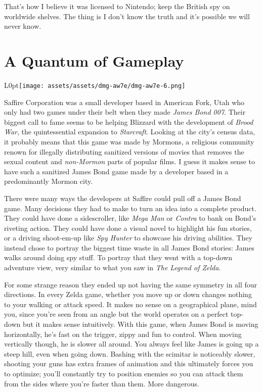 \documentclass{book}
\begin{document}
That’s how I believe it was licensed to Nintendo; keep the British spy on worldwide shelves. The thing is I don’t know the truth and it’s possible we will never know.\par
\FloatBarrier\section*{A Quantum of Gameplay}
\begin{wrapfigure}{L}{0pt}{\texttt{[image: assets/assets/dmg-aw7e/dmg-aw7e-6.png]}}\end{wrapfigure}\noindent
Saffire Corporation was a small developer based in American Fork, Utah who only had two games under their belt when they made \emph{James Bond 007}. Their biggest call to fame seems to be helping Blizzard with the development of \emph{Brood War}, the quintessential expansion to \emph{Starcraft}. Looking at the city’s census data, it probably means that this game was made by Mormons, a religious community renown for illegally distributing sanitized versions of movies that removes the sexual content and \emph{non-Mormon} parts of popular films. I guess it makes sense to have such a sanitized James Bond game made by a developer based in a predominantly Mormon city.\par
There were many ways the developers at Saffire could pull off a James Bond game. Many decisions they had to make to turn an idea into a complete product. They could have done a sidescroller, like \emph{Mega Man} or \emph{Contra} to bank on Bond’s riveting action. They could have done a visual novel to highlight his fun stories, or a driving shoot-em-up like \emph{Spy Hunter} to showcase his driving abilities. They instead chose to portray the biggest time waste in all James Bond stories: James walks around doing spy stuff. To portray that they went with a top-down adventure view, very similar to what you saw in \emph{The Legend of Zelda}.\par
For some strange reason they ended up not having the same symmetry in all four directions. In every Zelda game, whether you move up or down changes nothing to your walking or attack speed. It makes no sense on a geographical plane, mind you, since you’re seen from an angle but the world operates on a perfect top-down but it makes sense intuitively. With this game, when James Bond is moving horizontally, he’s fast on the trigger, zippy and fun to control. When moving vertically though, he is slower all around. You always feel like James is going up a steep hill, even when going down. Bashing with the scimitar is noticeably slower, shooting your guns has extra frames of animation and this ultimately forces you to optimize; you’ll constantly try to position enemies so you can attack them from the sides where you’re faster than them. More dangerous.\par
\end{document}
